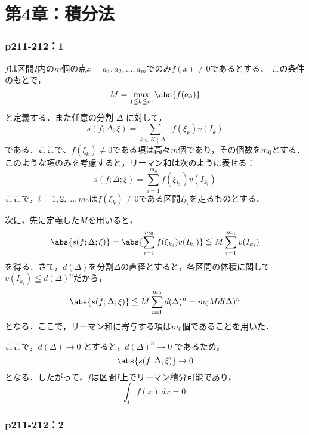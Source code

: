 \part*{第4章：積分法}



\section*{p211-212：1}


\begin{tproof}
    $f$は区間$I$内の$m$個の点$x = a_1, a_2, \ldots, a_m$でのみ$f(x) \ne 0$であるとする．
    この条件のもとで，
    \[
        M = \max_{1 \leqq k \leqq m} \abs{f(a_k)}
    \]
    と定義する．また任意の分割 $\Delta$ に対して，
    \[
        s(f; \Delta; \xi) = \sum_{k \in K(\Delta)} f(\xi_k) v(I_k)
    \]
    である．ここで、$f(\xi_k) \ne 0$である項は高々$m$個であり，その個数を$m_0$とする．
    このような項のみを考慮すると，リーマン和は次のように表せる：
    \[
        s(f; \Delta; \xi) = \sum_{i=1}^{m_0} f(\xi_{k_i}) v(I_{k_i})
    \]
    ここで，$i = 1, 2, \ldots, m_0$は$f(\xi_k) \ne 0$である区間$ I_{k_i} $を走るものとする．

    次に，先に定義した$M$を用いると，
    \[
        \abs{s(f; \Delta; \xi)} = \abs{\sum_{i=1}^{m_0} f(\xi_{k_i}) v(I_{k_i})} \leqq M \sum_{i=1}^{m_0} v(I_{k_i})
    \]
    を得る．さて，$d(\Delta)$を分割$\Delta$の直径とすると，各区間の体積に関して$ v(I_{k_i}) \leqq d(\Delta)^n $だから，
    \[
        \abs{s(f; \Delta; \xi)} \leqq M \sum_{i=1}^{m_0} d(\Delta)^n = m_0 M d(\Delta)^n
    \]
    となる．ここで，リーマン和に寄与する項は$m_0$個であることを用いた．

    ここで，$d(\Delta) \to 0$ とすると，$d(\Delta)^n \to 0$ であるため，
    \[
        \abs{s(f; \Delta; \xi)} \to 0
    \]
    となる．したがって，$f$は区間$I$上でリーマン積分可能であり，
    \[
        \int_{I} f(x)\, dx = 0.
    \]
\end{tproof}

\section*{p211-212：2}


